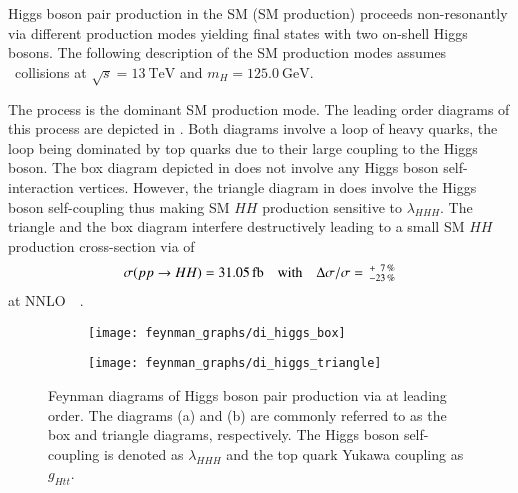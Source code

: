 Higgs boson pair production in the SM (SM \HH production) proceeds
non-resonantly via different production modes yielding final states with two
on-shell Higgs bosons. The following description of the SM \HH production modes
assumes \pp~collisions at $\sqrt{s} = \SI{13}{\TeV}$ and
$m_{H} = \SI{125.0}{\GeV}$.

The \ggF process is the dominant SM \HH production mode. The leading order
diagrams of this process are depicted in . Both
diagrams involve a loop of heavy quarks, the loop being dominated by top quarks
due to their large coupling to the Higgs boson. The box diagram depicted in
 does not involve any Higgs boson
self-interaction vertices.
However, the triangle diagram in
 does involve the Higgs boson self-coupling
thus making SM $HH$ production sensitive to $\lambda_{HHH}$. The triangle and
the box diagram interfere destructively leading to a small SM $HH$ production
cross-section via \ggF of
\begin{align*}
  \sigma(pp \to HH) = \SI{31.05}{\femto\barn}
  \quad \text{with} \quad
  \Delta \sigma / \sigma = \valuesep^{+\phantom{2}7\,\%}_{-23\,\%}
\end{align*}
at NNLO~\FTapprox~\cite{Grazzini:2018bsd,Baglio:2020wgt,LHCHWGHH}.

\begin{figure}[htbp]
  \centering

  \begin{subfigure}{0.49\textwidth}
    \centering
    \texttt{[image: feynman\_graphs/di\_higgs\_box]}
    \subcaption{}%
    \label{fig:dihiggs_ggf_feyn_box}
  \end{subfigure}\hfill%
  \begin{subfigure}{0.49\textwidth}
    \centering
    \texttt{[image: feynman\_graphs/di\_higgs\_triangle]}
    \subcaption{}%
    \label{fig:dihiggs_ggf_feyn_triangle}
  \end{subfigure}

  \caption{Feynman diagrams of Higgs boson pair production via \ggF at leading
    order. The diagrams (a) and (b) are commonly referred to as the box and
    triangle diagrams, respectively. The Higgs boson self-coupling is denoted as
    $\lambda_{HHH}$ and the top quark Yukawa coupling as $g_{Htt}$.}%
  \label{fig:dihiggs_ggf_feyn}
\end{figure}

